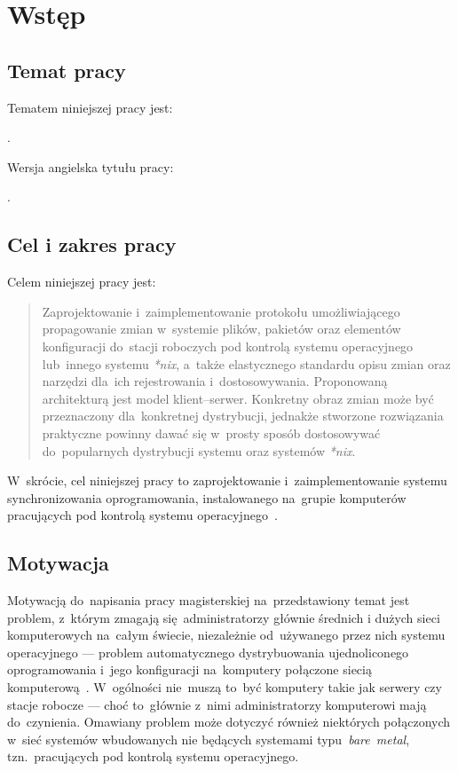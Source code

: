 \documentclass[thesis]{subfiles}
\makeatletter
\let\inserttitle\@title
\let\inserttitleaux\@titleaux
\makeatother
\begin{document}
\chapter{Wstęp}
\label{chapter:intro}

\section{Temat pracy}

\noindent Tematem niniejszej pracy jest:
\begin{displayquote}
\inserttitle.
\end{displayquote}
Wersja angielska tytułu pracy:
\begin{displayquote}
\inserttitleaux.
\end{displayquote}

\section{Cel i zakres pracy}
\label{cel-i-zakres}

\noindent Celem niniejszej pracy jest:
\blockcquote{formularz-zgloszenia-pracy}{Zaprojektowanie i~zaimplementowanie protokołu umożliwiającego propagowanie zmian w~systemie plików, pakietów oraz elementów konfiguracji do~stacji roboczych pod kontrolą systemu operacyjnego  lub~innego systemu \emph{*nix}, a~także elastycznego standardu opisu zmian oraz narzędzi dla~ich rejestrowania i~dostosowywania. Proponowaną architekturą jest model klient--serwer. Konkretny obraz zmian może być przeznaczony dla~konkretnej dystrybucji, jednakże stworzone rozwiązania praktyczne powinny dawać się w~prosty sposób dostosowywać do~popularnych dystrybucji systemu  oraz systemów \emph{*nix}.}
W~skrócie, cel niniejszej pracy to zaprojektowanie i~zaimplementowanie systemu synchronizowania oprogramowania, instalowanego na~grupie komputerów pracujących pod kontrolą systemu operacyjnego~.

\section{Motywacja}

Motywacją do~napisania pracy magisterskiej na~przedstawiony temat jest problem, z~którym zmagają się~administratorzy głównie średnich i dużych sieci komputerowych na~całym świecie, niezależnie od~używanego przez nich systemu operacyjnego --- problem automatycznego dystrybuowania ujednoliconego oprogramowania i~jego konfiguracji na~komputery połączone siecią komputerową~\cite{so-problem-intro}. W~ogólności nie~muszą to~być komputery takie jak serwery czy stacje robocze --- choć to~głównie z~nimi administratorzy komputerowi mają do~czynienia. Omawiany problem może dotyczyć również niektórych połączonych w~sieć systemów wbudowanych nie będących systemami typu~\mbox{\emph{bare~metal}}, tzn.~pracujących pod kontrolą systemu operacyjnego.
\end{document}
